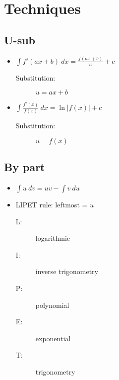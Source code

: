 \section{Techniques}
\subsection{U-sub}
\begin{itemize}
    \item $\int f'(ax+b) \: dx = \frac{f(ax+b)}{a}+c$
          \begin{description}
              \item[Substitution:] $u=ax+b$
          \end{description}
    \item $\int \frac{f'(x)}{f(x)} \: dx = \ln |f(x)|+c$
          \begin{description}
              \item[Substitution:] $u=f(x)$
          \end{description}
\end{itemize}
\subsection{By part}
\begin{itemize}
    \item $\int u \: dv = uv - \int v \: du$
    \item LIPET rule: leftmost = $u$
        \begin{description}
            \item[L:] logarithmic
            \item[I:] inverse trigonometry
            \item[P:] polynomial
            \item[E:] exponential
            \item[T:] trigonometry
        \end{description}
\end{itemize}